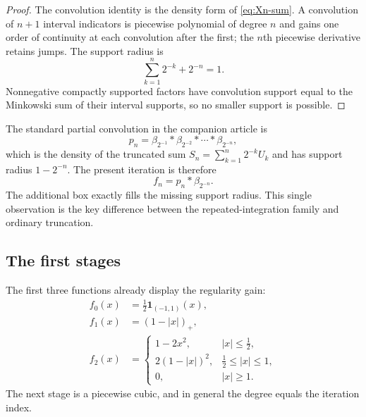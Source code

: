 \documentclass[11pt,oneside]{article}
\theoremstyle{definition}
\theoremstyle{remark}
\newcommand{\pos}[1]{\left(#1\right)_{+}}
\begin{document}
\begin{proof}
The convolution identity is the density form of \eqref{eq:Xn-sum}.  A convolution of $n+1$
interval indicators is piecewise polynomial of degree $n$ and gains one order of continuity
at each convolution after the first; the $n$th piecewise derivative retains jumps.  The
support radius is
\[
 \sum_{k=1}^{n}2^{-k}+2^{-n}=1.
\]
Nonnegative compactly supported factors have convolution support equal to the Minkowski sum
of their interval supports, so no smaller support is possible.
\end{proof}

The standard partial convolution in the companion article is
\begin{equation}
 p_n=\beta_{2^{-1}}*\beta_{2^{-2}}*\cdots*\beta_{2^{-n}},   \label{eq:pn}
\end{equation}
which is the density of the truncated sum
$S_n=\sum_{k=1}^{n}2^{-k}U_k$ and has support radius $1-2^{-n}$.  The present iteration is
therefore
\begin{equation}
 f_n=p_n*\beta_{2^{-n}}.                                   \label{eq:fn-pn}
\end{equation}
The additional box exactly fills the missing support radius.  This single observation is the
key difference between the repeated-integration family and ordinary truncation.

\subsection{The first stages}

The first three functions already display the regularity gain:
\begin{align}
 f_0(x)&=\frac12\mathbf 1_{(-1,1)}(x),                                      \label{eq:f0}\\
 f_1(x)&=\pos{1-|x|},                                                        \label{eq:f1}\\
 f_2(x)&=
 \begin{cases}
  1-2x^2,&|x|\le\tfrac12,\\
  2(1-|x|)^2,&\tfrac12\le|x|\le1,\\
  0,&|x|\ge1.
 \end{cases}                                                               \label{eq:f2}
\end{align}
The next stage is a piecewise cubic, and in general the degree equals the iteration index.
\end{document}
